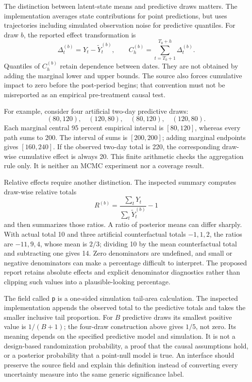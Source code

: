 The distinction between latent-state means and predictive draws matters.
The implementation averages state contributions for point predictions, but
uses trajectories including simulated observation noise for predictive
quantiles. For draw \(b\), the reported effect transformation is
\[
 \Delta_t^{(b)}=Y_t-\widetilde Y_t^{(b)},\qquad
 C_h^{(b)}=\sum_{t=T_0+1}^{T_0+h}\Delta_t^{(b)}.
\]
Quantiles of \(C_h^{(b)}\) retain dependence between dates. They are not
obtained by adding the marginal lower and upper bounds. The source also
forces cumulative impact to zero before the post-period begins; that
convention must not be misreported as an empirical pre-treatment causal
test. \citep{exec13_ci_semantics,exec13_ci_brodersen2015}

For example, consider four artificial two-day predictive draws:
\[
(80,120),\quad(120,80),\quad(80,120),\quad(120,80).
\]
Each marginal central 95 percent
empirical interval is \([80,120]\), whereas every path sums to 200. The
interval of sums is \([200,200]\); adding marginal endpoints gives
\([160,240]\). If the observed two-day total is 220, the corresponding
draw-wise cumulative effect is always 20. This finite arithmetic checks the
aggregation rule only. It is neither an MCMC experiment nor a coverage result.
\citep{exec13_cimpact_examples}

Relative effects require another distinction. The inspected summary computes
draw-wise relative totals
\[
 R^{(b)}=\frac{\sum_tY_t}{\sum_t\widetilde Y_t^{(b)}}-1
\]
and then summarizes those ratios. A ratio of posterior means can differ
sharply. With actual total 10 and three artificial counterfactual totals
\(-1,1,2\), the ratios are \(-11,9,4\), whose mean is \(2/3\); dividing
10 by the mean counterfactual total and subtracting one gives 14. Zero
denominators are undefined, and small or negative denominators can make a
percentage difficult to interpret. The proposed report retains absolute
effects and explicit denominator diagnostics rather than clipping such
values into a plausible-looking percentage. \citep{exec13_ci_semantics,exec13_cimpact_examples}

The field called \texttt{p} is a one-sided simulation tail-area calculation.
The inspected implementation appends the observed total to the predictive
totals and takes the smaller inclusive tail proportion. For \(B\) predictive
draws its smallest positive value is \(1/(B+1)\); the four-draw construction
above gives \(1/5\), not zero. Its meaning depends on the specified predictive
model and simulation. It is not a design-based randomization probability, a
proof that the causal assumptions hold, or a posterior probability that a
point-null model is true. An interface should preserve the source field and
explain this definition instead of converting every uncertainty measure into
the same generic significance label. \citep{exec13_ci_semantics,exec13_cimpact_examples}

